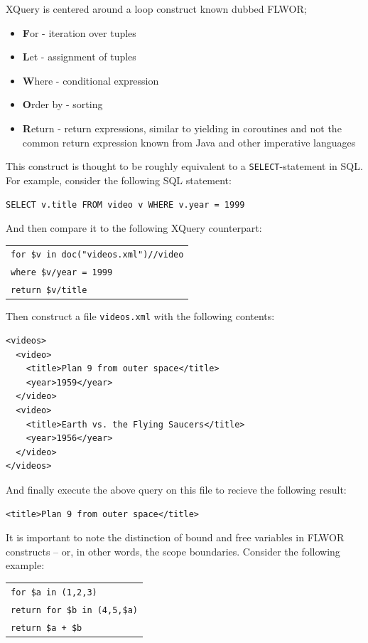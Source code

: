 XQuery is centered around a loop construct known dubbed FLWOR;
\begin{itemize}
  \item \textbf{F}or - iteration over tuples
  \item \textbf{L}et - assignment of tuples
  \item \textbf{W}here - conditional expression
  \item \textbf{O}rder by - sorting 
  \item \textbf{R}eturn - return expressions, similar to yielding in coroutines
  and not the common return expression known from Java and other imperative
  languages
\end{itemize}
This construct is thought to be roughly equivalent to a
\texttt{SELECT}-statement in SQL. For example, consider the following SQL
statement: 
\begin{center}
\verb!SELECT v.title FROM video v WHERE v.year = 1999!
\end{center}
And then compare it to the following XQuery counterpart:
\begin{center}
\begin{tabular}{l}
\texttt{for \$v in doc("videos.xml")//video} \\
\texttt{where \$v/year = 1999}\\
\texttt{return \$v/title}\\
\end{tabular}
\end{center}
Then construct a file \texttt{videos.xml} with the following contents:
\begin{center}
\begin{minipage}[h]{9.5cm}
\begin{verbatim}
<videos>
  <video>
    <title>Plan 9 from outer space</title>
    <year>1959</year>
  </video>
  <video>
    <title>Earth vs. the Flying Saucers</title>
    <year>1956</year>
  </video>
</videos>
\end{verbatim}
\end{minipage}
\end{center}
And finally execute the above query on this file to recieve the following
result:
\begin{center}
\begin{minipage}[h]{7.5cm}
\begin{verbatim}
<title>Plan 9 from outer space</title>
\end{verbatim}
\end{minipage}
\end{center}
It is important to note the distinction of bound and free variables in FLWOR
constructs -- or, in other words, the scope boundaries. Consider the following
example:
\begin{center}
\begin{tabular}{l}
\texttt{for \$a in (1,2,3)} \\ \quad
  \texttt{return for \$b in (4,5,\$a)}\\ \quad\quad
    \texttt{return \$a + \$b}
\end{tabular}
\end{center}

